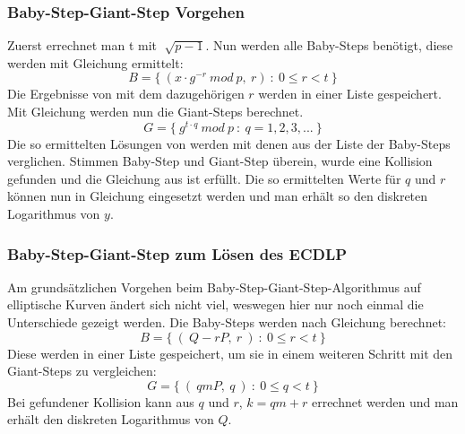 		\subsubsection{Baby-Step-Giant-Step Vorgehen}
			Zuerst errechnet man t mit $\sqrt[]{p-1}$. Nun werden alle Baby-Steps benötigt, diese werden mit Gleichung  ermittelt:
			\begin{equation}
				B = \{~(x \cdot g^{-r}~mod~p,~r)~:~0 \leq r < t~\}
			\label{Gleichung Baby steps}
			\end{equation}
			Die Ergebnisse von  mit dem dazugehörigen $r$ werden in einer Liste gespeichert. Mit Gleichung  werden nun die Giant-Steps berechnet.
			\begin{equation}
				G = \{~g^{t \cdot q}~mod~p~:~q = 1,2,3,...~\}
			\label{Gleichung Giant steps}
			\end{equation}
			Die so ermittelten Lösungen von  werden mit denen aus der Liste der Baby-Steps verglichen. Stimmen Baby-Step und Giant-Step überein, wurde eine Kollision gefunden und die Gleichung aus  ist erfüllt. Die so ermittelten Werte für $q$ und $r$ können nun in Gleichung  eingesetzt werden und man erhält so den diskreten Logarithmus von $y$.
		\subsubsection{Baby-Step-Giant-Step zum Lösen des ECDLP}
			Am grundsätzlichen Vorgehen beim Baby-Step-Giant-Step-Algorithmus auf elliptische Kurven ändert sich nicht viel, weswegen hier nur noch einmal die Unterschiede gezeigt werden. Die Baby-Steps werden nach Gleichung  berechnet:
			\begin{equation}
				B = \{~(~Q- rP,~r~)~:~0 \leq r < t~\}
				\label{Gleichung Baby steps für elliptische Kurven}
			\end{equation}
			Diese werden in einer Liste gespeichert, um sie in einem weiteren Schritt mit den Giant-Steps zu vergleichen:
			\begin{equation}
				G = \{~(~qmP,~q~)~:~0 \leq q < t~\}
				\label{Gleichung Giant steps für elliptische Kurven}
			\end{equation}
			Bei gefundener Kollision kann aus $q$ und $r$, $k = qm + r$ errechnet werden und man erhält den diskreten Logarithmus von $Q$.
